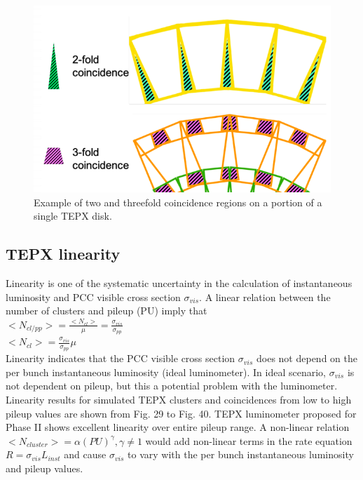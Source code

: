 \begin{figure}[H]
  \centering
  \includegraphics[width=0.6\columnwidth]{ashish_thesis/23coin.png}
  \caption{\onehalfspacing Example of two and threefold coincidence regions on a portion of a single TEPX disk.}
  \label{fig:CMS}
\end{figure}

\subsection{TEPX linearity}

Linearity is one of the systematic uncertainty in the calculation of instantaneous luminosity and PCC visible cross section $\sigma_{vis}$. A linear relation between the number of clusters and pileup (PU) imply that \\

$<N_{cl/pp}> = \frac{<N_{cl}>}{\mu} = \frac{\sigma_{vis}}{\sigma_{pp}}$ \\

$<N_{cl}> =  \frac{\sigma_{vis}}{\sigma_{pp}} \mu $ \\

Linearity indicates that the PCC visible cross section $\sigma_{vis}$ does not depend on the per bunch instantaneous luminosity (ideal luminometer). In ideal scenario, $\sigma_{vis}$ is not dependent on pileup, but this a potential problem with the luminometer. Linearity results for simulated TEPX clusters and coincidences from low to high pileup values are shown from Fig. 29 to Fig. 40. TEPX luminometer proposed for Phase II shows excellent linearity over entire pileup range. A non-linear relation $<N_{cluster}> = \alpha (PU)^{\gamma}, \gamma \neq 1$ would add non-linear terms in the rate equation $R = \sigma_{vis} L_{inst}$  and cause $\sigma_{vis}$ to vary with the per bunch instantaneous luminosity and pileup values.


